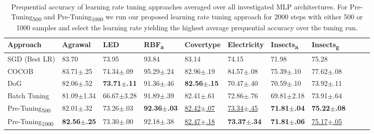 \documentclass{article} %
\begin{document}
\begin{table}[!hb]
   \centering
   \small
   \caption{
      Prequential accuracy of learning rate tuning approaches averaged over all investigated MLP architectures. For Pre-Tuning\textsubscript{500} and Pre-Tuning\textsubscript{1000} we run our proposed learning rate tuning approach for 2000 steps with either 500 or 1000 samples and select the learning rate yielding the highest average prequential accuracy over the tuning run.
   }\label{tab:lr_tuning}
   \begin{tabular}{lllllllllll}
      \toprule
      Approach                       & Agrawal                 & LED                     & RBF\textsubscript{a}    & Covertype                 & Electricity               & Insects\textsubscript{a} & Insects\textsubscript{g}  \\
      \midrule
      SGD (Best LR)                  & 83.70                   & 73.95                   & 93.84                   & 83.14                     & 74.15                     & 71.98                    & 75.28                     \\
      COCOB                          & 83.71$\pm$.25           & 74.34$\pm$.09           & 95.29$\pm$.24           & 82.96$\pm$.19             & 84.57$\pm$.08             & 75.39$\pm$.10            & 77.62$\pm$.08             \\ \midrule
      DoG                            & 82.06$\pm$.52           & \bfseries 73.71$\pm$.11 & 91.36$\pm$.46           & \bfseries 82.56$\pm$.15   & 70.47$\pm$.40             & 70.59$\pm$.10            & 73.92$\pm$.11             \\
      Batch Tuning                   & 81.09$\pm$1.34          & 66.67$\pm$3.28          & 91.89$\pm$.39           & 82.41$\pm$.61             & 72.86$\pm$.76             & 69.81$\pm$2.18           & 73.91$\pm$.64             \\
      Pre-Tuning\textsubscript{500}  & 82.01$\pm$.32           & 73.26$\pm$.03           & \bfseries 92.36$\pm$.03 & \underline{82.42$\pm$.07} & \underline{73.34$\pm$.45} & \bfseries 71.81$\pm$.04  & \bfseries 75.22$\pm$.08   \\
      Pre-Tuning\textsubscript{1000} & \bfseries 82.56$\pm$.25 & 73.30$\pm$.00           & 92.18$\pm$.38           & \underline{82.47$\pm$.18} & \bfseries 73.37$\pm$.34   & \bfseries 71.81$\pm$.06  & \underline{75.17$\pm$.05} \\
      \bottomrule
   \end{tabular}
\end{table}
\end{document}
